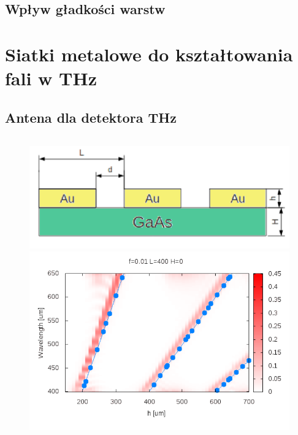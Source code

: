 \documentclass{beamer}
\begin{document}
\begin{frame}[t]
\begin{columns}
	\end{columns}
		
\end{frame}

\subsection{Wpływ gładkości warstw}


\section{Siatki metalowe do kształtowania fali w THz}
\subsection{Antena dla detektora THz}
\begin{frame}
	\begin{columns}
		\begin{column}{0.5\textwidth}
			\begin{figure}
				\includegraphics[width=\textwidth]{../images/antenaThz/schemat.png}\\
				\includegraphics[width=\textwidth]{../images/antenaThz/rezonant_trans_f001.png}\\

\end{figure}
\end{column}
\end{columns}
\end{frame}
\end{document}
